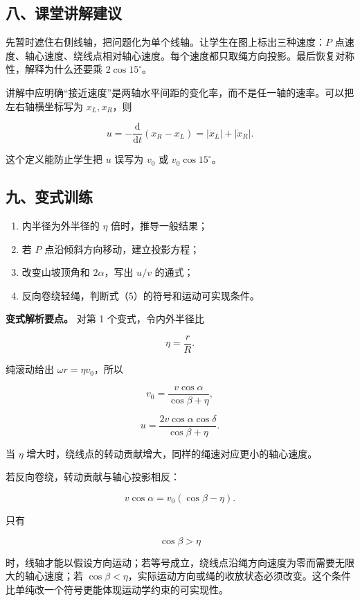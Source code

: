 \documentclass[12pt,a4paper,UTF8]{ctexart}
\newcommand{\tightlist}{\setlength{\itemsep}{0pt}\setlength{\parskip}{0pt}}
\begin{document}
\subsection{八、课堂讲解建议}\label{ux516bux8bfeux5802ux8bb2ux89e3ux5efaux8bae-3}

先暂时遮住右侧线轴，把问题化为单个线轴。让学生在图上标出三种速度：\(P\)
点速度、轴心速度、绕线点相对轴心速度。每个速度都只取绳方向投影。最后恢复对称性，解释为什么还要乘
\(2\cos15^\circ\)。

讲解中应明确``接近速度''是两轴水平间距的变化率，而不是任一轴的速率。可以把左右轴横坐标写为
\(x_L,x_R\)，则

\[
u=-\frac{\mathrm d}{\mathrm dt}(x_R-x_L)
=|\dot x_L|+|\dot x_R|.
\]

这个定义能防止学生把 \(u\) 误写为 \(v_0\) 或 \(v_0\cos15^\circ\)。

\subsection{九、变式训练}\label{ux4e5dux53d8ux5f0fux8badux7ec3-3}

\begin{enumerate}
\def\labelenumi{\arabic{enumi}.}
\tightlist
\item
  内半径为外半径的 \(\eta\) 倍时，推导一般结果；
\item
  若 \(P\) 点沿倾斜方向移动，建立投影方程；
\item
  改变山坡顶角和 \(2\alpha\)，写出 \(u/v\) 的通式；
\item
  反向卷绕轻绳，判断式（5）的符号和运动可实现条件。
\end{enumerate}

\textbf{变式解析要点。} 对第 1 个变式，令内外半径比

\[
\eta=\frac rR.
\]

纯滚动给出 \(\omega r=\eta v_0\)，所以

\[
v_0
=\frac{v\cos\alpha}{\cos\beta+\eta},
\]

\[
u
=\frac{2v\cos\alpha\cos\delta}
{\cos\beta+\eta}.
\]

当 \(\eta\) 增大时，绕线点的转动贡献增大，同样的绳速对应更小的轴心速度。

若反向卷绕，转动贡献与轴心投影相反：

\[
v\cos\alpha
=v_0(\cos\beta-\eta).
\]

只有

\[
\cos\beta>\eta
\]

时，线轴才能以假设方向运动；若等号成立，绕线点沿绳方向速度为零而需要无限大的轴心速度；若
\(\cos\beta<\eta\)，实际运动方向或绳的收放状态必须改变。这个条件比单纯改一个符号更能体现运动学约束的可实现性。
\end{document}

